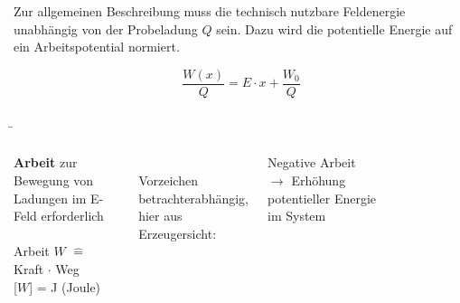 \begin{frame}
{ Zur allgemeinen Beschreibung muss die technisch nutzbare Feldenergie unabhängig von der Probeladung $Q$ sein.
Dazu wird die potentielle Energie auf ein Arbeitspotential normiert. 

 \begin{equation*}
	\frac{W(x)}{Q} =  E \cdot x + \frac{W_0}{Q}
 \end{equation*}

 

	}

	\b{
	\begin{columns}

		


		\textbf{Arbeit} zur Bewegung von Ladungen im E-Feld erforderlich \\

		\phantom{.}\\
		
		Arbeit $W$ $\widehat{=}$ Kraft $\cdot$ Weg\\

		[$W$] = J (Joule)

		
		\phantom{.}\\

		Vorzeichen betrachterabhängig, hier aus Erzeugersicht:

		Negative Arbeit $\rightarrow$ Erhöhung potentieller Energie im System





	\begin{columns}



	\begin{figure}[h!]
		\centering
		

	\end{figure}





\end{columns}
\end{columns}}
\end{frame}
